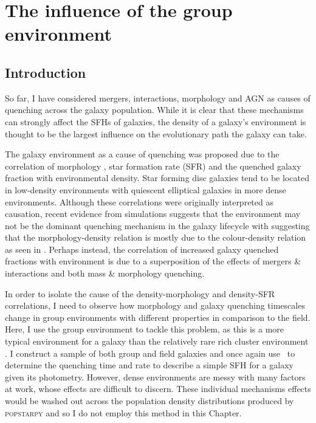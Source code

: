 \chapter{The influence of the group environment}\label{chap:env}

\section{Introduction}\label{sec:intro}
 
 So far, I have considered mergers, interactions, morphology and AGN as causes of quenching across the galaxy population. While it is clear that these mechanisms can strongly affect the SFHs of galaxies, the density of a galaxy's environment is thought to be the largest influence on the evolutionary path the galaxy can take. 
 
 The galaxy environment as a cause of quenching was proposed due to the correlation of morphology \citep{dressler80, smail97, poggianti99, postman05, Bamford09}, star formation rate (SFR) and the quenched galaxy fraction \citep{kauffmann03, Baldry06, peng12, darvish16} with environmental density. Star forming disc galaxies tend to be located in low-density environments with quiescent elliptical galaxies in more dense environments. Although these correlations were originally interpreted as causation, recent evidence from simulations suggests that the environment may not be the dominant quenching mechanism in the galaxy lifecycle \citep{ref, ref} with \citet{skibba09} suggesting that the morphology-density relation is mostly due to the colour-density relation as seen in \citet{pimbblet02}. Perhaps instead, the correlation of increased galaxy quenched fractions with environment is due to a superposition of the effects of mergers \& interactions and both mass \& morphology quenching. 
  
In order to isolate the cause of the density-morphology and density-SFR correlations, I need to observe how morphology and galaxy quenching timescales change in group environments with different properties in comparison to the field. Here, I use the group environment to tackle this problem, as this is a more typical environment for a galaxy than the relatively rare rich cluster environment \citep{carlberg04}. I construct a sample of both group and field galaxies and once again use \starpy\ to determine the quenching time and rate to describe a simple SFH for a galaxy given its photometry. However, dense environments are messy with many factors at work, whose effects are difficult to discern. These individual mechanisms effects would be washed out across the population density distributions produced by \textsc{popstarpy} and so I do not employ this method in this Chapter. 

